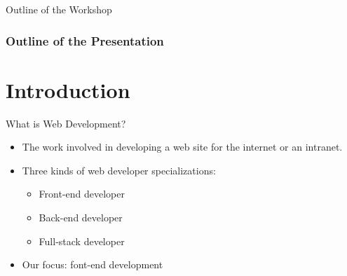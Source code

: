 \documentclass[aspectratio=169]{beamer}
\begin{document}
    \begin{darkframes}
    
    \begin{frame}{Outline of the Workshop}
        \frametitle{Outline of the Presentation}
        \tableofcontents
    \end{frame}
    
    \section{Introduction}
    \begin{frame}{What is Web Development?}
        \begin{itemize}
            \item The work involved in developing a web site for the internet or an intranet.
            \item Three kinds of web developer specializations:
            \begin{itemize}
                \item Front-end developer
                \item Back-end developer
                \item Full-stack developer
            \end{itemize}
            \item Our focus: font-end development
        \end{itemize}
    \end{frame}
    

\end{darkframes}
\end{document}
